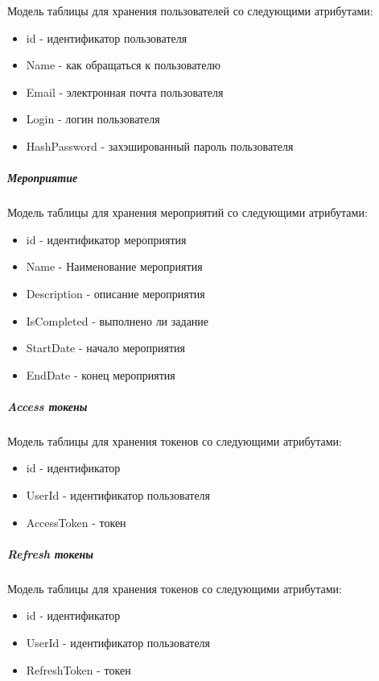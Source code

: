 Модель таблицы для хранения пользователей со следующими атрибутами:
\begin{itemize}
  \item id - идентификатор пользователя
  \item Name - как обращаться к пользователю
  \item Email - электронная почта пользователя
  \item Login - логин пользователя
  \item HashPassword - захэшированный пароль пользователя
\end{itemize}

\subparagraph{Мероприятие} \hspace{0pt}

Модель таблицы для хранения мероприятий со следующими атрибутами:
\begin{itemize}
  \item id - идентификатор мероприятия
  \item Name - Наименование мероприятия
  \item Description - описание мероприятия
  \item IsCompleted - выполнено ли задание
  \item StartDate - начало мероприятия
  \item EndDate - конец мероприятия
\end{itemize}

\subparagraph{Access токены} \hspace{0pt}

Модель таблицы для хранения токенов со следующими атрибутами:
\begin{itemize}
  \item id - идентификатор
  \item UserId - идентификатор пользователя
  \item AccessToken - токен
\end{itemize}

\subparagraph{Refresh токены} \hspace{0pt}

Модель таблицы для хранения токенов со следующими атрибутами:
\begin{itemize}
  \item id - идентификатор
  \item UserId - идентификатор пользователя
  \item RefreshToken - токен
\end{itemize}


